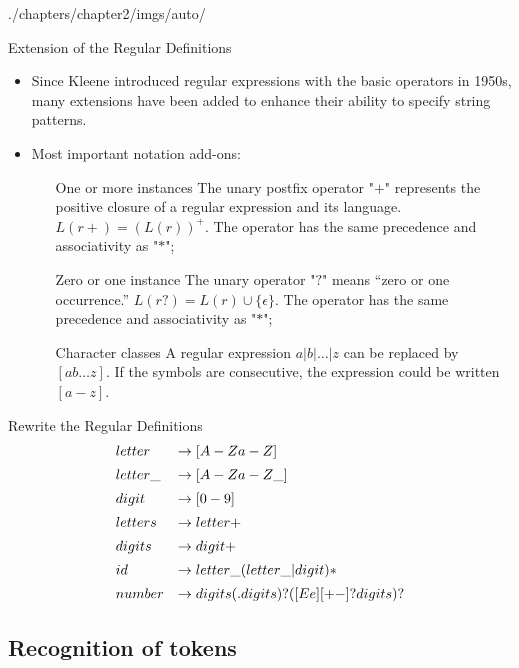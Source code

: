 \begin{graphicspathcontext}{{./chapters/chapter2/imgs/auto/}}
\begin{bibunit}[apalike]
\begin{frame}{Extension of the Regular Definitions}
	\begin{itemize}
	\item Since Kleene introduced regular expressions with the basic operators in 1950s, many extensions have been added to enhance their ability to specify string patterns.
	\item Most important notation add-ons: \begin{enumerate}
		\item[One or more instances] The unary postfix operator "$+$" represents the positive closure of a regular expression and its language. $L(r+) = (L(r))^+$. The operator has the same precedence and associativity as "$*$";
		\item[Zero or one instance] The unary operator "$?$" means ``zero or one occurrence.'' $L(r?) = L(r)\cup\{\epsilon\}$. The operator has the same precedence and associativity as "$*$";
		\item[Character classes] A regular expression $a|b|\dots|z$ can be replaced by $[ab{\dots}z]$. If the symbols are consecutive, the expression could be written $[a-z]$.
		\end{enumerate}
	\end{itemize}
\end{frame}

\begin{frame}{Rewrite the Regular Definitions}
	\[\begin{array}{@{}ll@{}}
		letter & \rightarrow [A-Za-Z] \\[.5em]
		letter\_ & \rightarrow [A-Za-Z\_] \\[.5em]
		digit & \rightarrow [0-9] \\[.5em]
		letters & \rightarrow letter+ \\[.5em]
		digits & \rightarrow digit+ \\[.5em]
		id & \rightarrow letter\_ ( letter\_ | digit )* \\[.5em]
		number & \rightarrow digits (.digits)? ([Ee][+-]? digits)?
	\end{array}\]
\end{frame}

\subsection{Recognition of tokens}

\tableofcontentslide[sections={2-5},sectionstyle={show/shaded},subsectionstyle={show/shaded/hide},subsubsectionstyle={show/show/hide/hide}]


\end{bibunit}
\end{graphicspathcontext}
